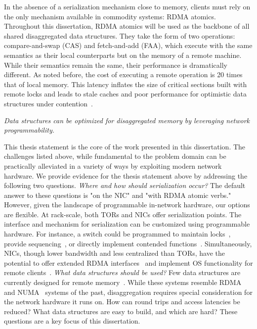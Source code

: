 \documentclass[12pt]{ucsddissertation}
\begin{document}
\begin{dissertationintroduction}
In the absence of a serialization mechanism close to memory, clients must rely on the only mechanism
available in commodity systems: RDMA atomics. Throughout this dissertation, RDMA atomics will be
used as the backbone of all shared disaggregated data structures. They take the form of two
operations: compare-and-swap (CAS) and fetch-and-add (FAA), which execute with the same semantics as
their local counterparts but on the memory of a remote machine. While their semantics remain the
same, their performance is dramatically different. As noted before, the cost of executing a remote
operation is 20 times that of local memory. This latency inflates the size of critical sections
built with remote locks and leads to stale caches and poor performance for optimistic data
structures under contention~\cite{clover,sherman,fusee,race,rolex}.

\begin{center}
\textit{Data structures can be optimized for disaggregated memory by leveraging network programmability.} \\
\end{center}

This thesis statement is the core of the work presented in this dissertation. The challenges listed
above, while fundamental to the problem domain can be practically alleviated in a variety of ways by
exploiting modern network hardware. We provide evidence for the thesis statement above by addressing
the following two questions.
\textit{Where and how should serialization occur?} The default answer to these questions is "on the
NIC" and "with RDMA atomic verbs." However, given the landscape of programmable in-network hardware,
our options are flexible. At rack-scale, both TORs and NICs offer serialization points. The
interface and mechanism for serialization can be customized using programmable hardware. For
instance, a switch could be programmed to maintain locks~\cite{netlock}, provide
sequencing~\cite{when-computer}, or directly implement contended functions~\cite{mind}.
Simultaneously, NICs, though lower bandwidth and less centralized than TORs, have the potential to
offer extended RDMA interfaces~\cite{prism} and implement OS functionality for remote
clients~\cite{clio, supernic}.
\textit{What data structures should be used?} Few data structures are currently designed for remote
memory~\cite{clover,fusee,race,sherman,rolex,ditto}. While these systems resemble
RDMA~\cite{pilaf,herd,cell} and NUMA~\cite{flat-combining,hopscotch,bbn} systems of the past,
disaggregation requires special consideration for the network hardware it runs on. How can round
trips and access latencies be reduced? What data structures are easy to build, and which are hard?
These questions are a key focus of this dissertation.


\end{dissertationintroduction}
\end{document}

